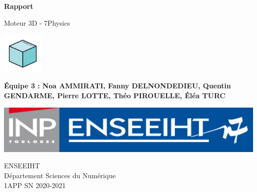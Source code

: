 \begin{titlepage}
   \begin{center}
       \vspace*{5cm}

       \Huge\textbf{Rapport}

       \vspace{0.5cm}
       \Large


       Moteur 3D - 7Physics


       \includegraphics[width=2cm]{./logo.png}

       \vspace{1cm}

       \large
       \textbf{Équipe 3 : Noa AMMIRATI, Fanny DELNONDEDIEU, Quentin GENDARME, Pierre LOTTE, Théo PIROUELLE, Éléa TURC}

       \vfill

       \includegraphics[width=15cm]{./enseeiht.jpeg}

       \vspace{2cm}

       ENSEEIHT\\
       Département Sciences du Numérique\\
       1APP SN 2020-2021


   \end{center}
\end{titlepage}
